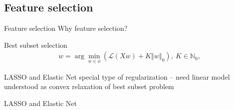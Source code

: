 \subsection{Feature selection}
\begin{frame}{Feature selection}
Why feature selection?
\end{frame}
\begin{frame}{Best subset selection}
\begin{align*}
w=\arg\min_{w\in \mathbb{d}}\left(\mathcal{L}\left(Xw\right) + K\left\Vert w \right\Vert_0\right), \: K\in\mathbb{N}_{0},
\end{align*}
\end{frame}
\begin{frame}{LASSO and Elastic Net}
special type of regularization -- need linear model
understood as convex relaxation of best subset problem
\end{frame}
\begin{frame}{LASSO and Elastic Net}

\end{frame}
